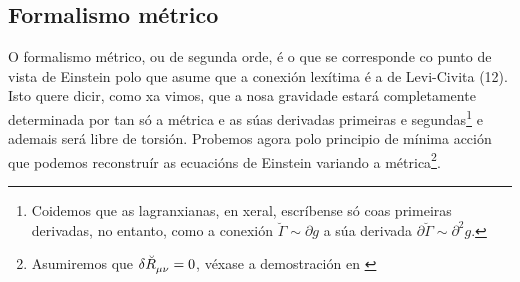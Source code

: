 \subsection{Formalismo métrico}
O formalismo métrico, ou de segunda orde, é o que se corresponde co punto de vista de Einstein polo que asume que a conexión lexítima é a de Levi-Civita (12). Isto quere dicir, como xa vimos, que a nosa gravidade estará completamente determinada por tan só a métrica e as súas derivadas primeiras e segundas\footnote{Coidemos que as lagranxianas, en xeral, escríbense só coas primeiras derivadas, no entanto, como a conexión $\breve\Gamma\sim\partial g$ a súa derivada $\partial\breve\Gamma\sim\partial^2 g$.} e ademais será libre de torsión. 
Probemos agora polo principio de mínima acción que podemos reconstruír as ecuacións de Einstein variando a métrica\footnote{Asumiremos que $\delta\breve R\indices{_\mu_\nu} = 0$, véxase a demostración en \cite{clave}}.
  
